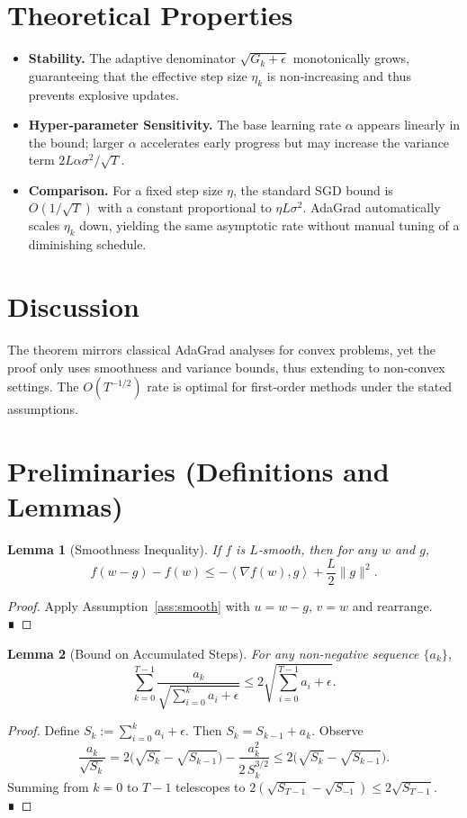 \documentclass{article}
\newtheorem{lemma}{Lemma}
\newcommand{\inner}[2]{\left\langle #1,#2\right\rangle}
\begin{document}
\section*{Theoretical Properties}
\begin{itemize}
\item \textbf{Stability.} The adaptive denominator $\sqrt{G_k+\epsilon}$ monotonically grows, guaranteeing that the effective step size $\eta_k$ is non‑increasing and thus prevents explosive updates.
\item \textbf{Hyper‑parameter Sensitivity.} The base learning rate $\alpha$ appears linearly in the bound; larger $\alpha$ accelerates early progress but may increase the variance term $2L\alpha\sigma^{2}/\sqrt{T}$.
\item \textbf{Comparison.} For a fixed step size $\eta$, the standard SGD bound is $O(1/\sqrt{T})$ with a constant proportional to $\eta L\sigma^{2}$. AdaGrad automatically scales $\eta_k$ down, yielding the same asymptotic rate without manual tuning of a diminishing schedule.
\end{itemize}

\section*{Discussion}
The theorem mirrors classical AdaGrad analyses for convex problems, yet the proof only uses smoothness and variance bounds, thus extending to non‑convex settings. The $O(T^{-1/2})$ rate is optimal for first‑order methods under the stated assumptions.

\newpage
\section*{Preliminaries (Definitions and Lemmas)}
\begin{lemma}[Smoothness Inequality]\label{lem:smooth}
If $f$ is $L$‑smooth, then for any $w$ and $g$,
\[
f(w-g)-f(w)\le -\inner{\nabla f(w)}{g}+\frac{L}{2}\|g\|^{2}.
\]
\end{lemma}
\begin{proof}
Apply Assumption~\ref{ass:smooth} with $u=w-g$, $v=w$ and rearrange. ∎
\end{proof}

\begin{lemma}[Bound on Accumulated Steps]\label{lem:stepbound}
For any non‑negative sequence $\{a_k\}$,
\[
\sum_{k=0}^{T-1}\frac{a_k}{\sqrt{\sum_{i=0}^{k}a_i+\epsilon}}\le 2\sqrt{\sum_{i=0}^{T-1}a_i+\epsilon}.
\]
\end{lemma}
\begin{proof}
Define $S_k:=\sum_{i=0}^{k}a_i+\epsilon$. Then $S_{k}=S_{k-1}+a_k$. Observe
\[
\frac{a_k}{\sqrt{S_k}}=2\big(\sqrt{S_k}-\sqrt{S_{k-1}}\big)-\frac{a_k^{2}}{2\,S_k^{3/2}}\le 2\big(\sqrt{S_k}-\sqrt{S_{k-1}}\big).
\]
Summing from $k=0$ to $T-1$ telescopes to $2(\sqrt{S_{T-1}}-\sqrt{S_{-1}})\le2\sqrt{S_{T-1}}$. ∎
\end{proof}
\end{document}
